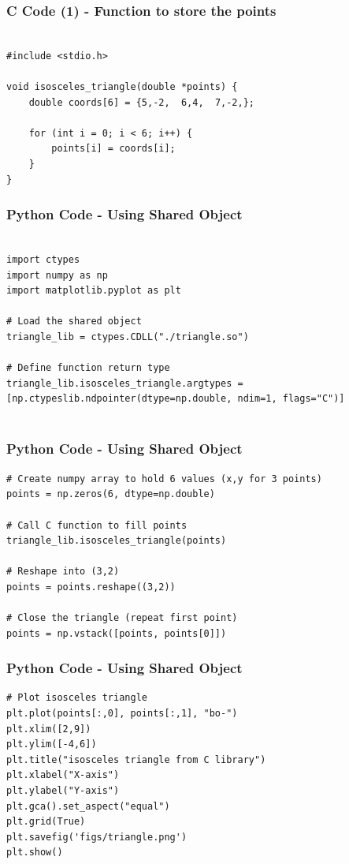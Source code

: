 \documentclass{beamer}
\begin{document}
\begin{frame}[fragile]
    \frametitle{C Code (1) - Function to store the points }

    \begin{lstlisting}

#include <stdio.h>

void isosceles_triangle(double *points) {
    double coords[6] = {5,-2,  6,4,  7,-2,};

    for (int i = 0; i < 6; i++) {
        points[i] = coords[i];
    }
}

    \end{lstlisting}
\end{frame}


\begin{frame}[fragile]
    \frametitle{Python Code - Using Shared Object}
    \begin{lstlisting}

import ctypes
import numpy as np
import matplotlib.pyplot as plt

# Load the shared object
triangle_lib = ctypes.CDLL("./triangle.so")

# Define function return type
triangle_lib.isosceles_triangle.argtypes = [np.ctypeslib.ndpointer(dtype=np.double, ndim=1, flags="C")]


\end{lstlisting}
\end{frame}

\begin{frame}[fragile]
    \frametitle{Python Code - Using Shared Object}
    \begin{lstlisting}
# Create numpy array to hold 6 values (x,y for 3 points)
points = np.zeros(6, dtype=np.double)

# Call C function to fill points
triangle_lib.isosceles_triangle(points)

# Reshape into (3,2)
points = points.reshape((3,2))

# Close the triangle (repeat first point)
points = np.vstack([points, points[0]])

\end{lstlisting}
\end{frame}
\begin{frame}[fragile]
    \frametitle{Python Code - Using Shared Object}
    \begin{lstlisting}
# Plot isosceles triangle
plt.plot(points[:,0], points[:,1], "bo-")
plt.xlim([2,9])
plt.ylim([-4,6])
plt.title("isosceles triangle from C library")
plt.xlabel("X-axis")
plt.ylabel("Y-axis")
plt.gca().set_aspect("equal")
plt.grid(True)
plt.savefig('figs/triangle.png')
plt.show()





\end{lstlisting}
\end{frame}
\end{document}
